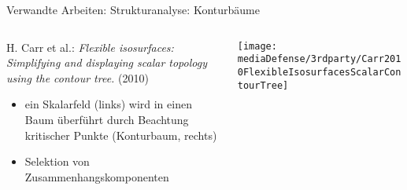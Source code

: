 \documentclass[10pt]{beamer}
\begin{document}
\begin{frame}{Verwandte Arbeiten: Strukturanalyse: Konturbäume}
	\begin{columns}[T]
		\begin{column}{.5\textwidth}
			\scriptsize {
				H. Carr et al.: \textit{Flexible isosurfaces: Simplifying and displaying scalar topology using the contour tree.} (2010)
			
				\begin{itemize}
					\item ein Skalarfeld (links) wird in einen Baum überführt durch Beachtung kritischer Punkte (Konturbaum, rechts)
					\item Selektion von Zusammenhangskomponenten %
				\end{itemize}
			}
		\end{column}
		\begin{column}{.5\textwidth}
			\texttt{[image: mediaDefense/3rdparty/Carr2010FlexibleIsosurfacesScalarContourTree]}
		\end{column}
	\end{columns}
	\vspace{.08\textheight}
\end{frame}
\end{document}
